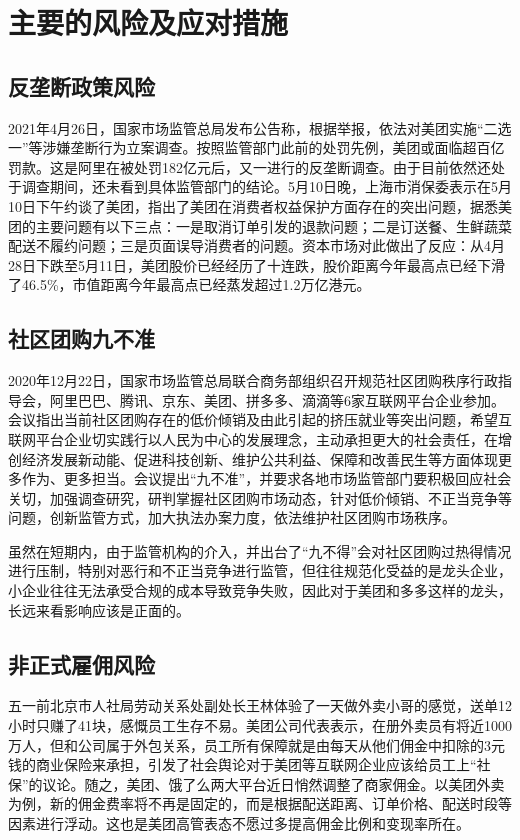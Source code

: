 \documentclass[UTF8,a4paper,12pt,lang=cn,fontset = windows]{elegantpaper} %
\begin{document}
\section{主要的风险及应对措施}
\subsection{反垄断政策风险}
2021年4月26日，国家市场监管总局发布公告称，根据举报，依法对美团实施“二选一”等涉嫌垄断行为立案调查。按照监管部门此前的处罚先例，美团或面临超百亿罚款。这是阿里在被处罚182亿元后，又一进行的反垄断调查。由于目前依然还处于调查期间，还未看到具体监管部门的结论。5月10日晚，上海市消保委表示在5月10日下午约谈了美团，指出了美团在消费者权益保护方面存在的突出问题，据悉美团的主要问题有以下三点：一是取消订单引发的退款问题；二是订送餐、生鲜蔬菜配送不履约问题；三是页面误导消费者的问题。资本市场对此做出了反应：从4月28日下跌至5月11日，美团股价已经经历了十连跌，股价距离今年最高点已经下滑了46.5\%，市值距离今年最高点已经蒸发超过1.2万亿港元。
\subsection{社区团购九不准}
2020年12月22日，国家市场监管总局联合商务部组织召开规范社区团购秩序行政指导会，阿里巴巴、腾讯、京东、美团、拼多多、滴滴等6家互联网平台企业参加。会议指出当前社区团购存在的低价倾销及由此引起的挤压就业等突出问题，希望互联网平台企业切实践行以人民为中心的发展理念，主动承担更大的社会责任，在增创经济发展新动能、促进科技创新、维护公共利益、保障和改善民生等方面体现更多作为、更多担当。会议提出“九不准”，并要求各地市场监管部门要积极回应社会关切，加强调查研究，研判掌握社区团购市场动态，针对低价倾销、不正当竞争等问题，创新监管方式，加大执法办案力度，依法维护社区团购市场秩序。

虽然在短期内，由于监管机构的介入，并出台了“九不得”会对社区团购过热得情况进行压制，特别对恶行和不正当竞争进行监管，但往往规范化受益的是龙头企业，小企业往往无法承受合规的成本导致竞争失败，因此对于美团和多多这样的龙头，长远来看影响应该是正面的。
\subsection{非正式雇佣风险}
五一前北京市人社局劳动关系处副处长王林体验了一天做外卖小哥的感觉，送单12小时只赚了41块，感慨员工生存不易。美团公司代表表示，在册外卖员有将近1000万人，但和公司属于外包关系，员工所有保障就是由每天从他们佣金中扣除的3元钱的商业保险来承担，引发了社会舆论对于美团等互联网企业应该给员工上“社保”的议论。随之，美团、饿了么两大平台近日悄然调整了商家佣金。以美团外卖为例，新的佣金费率将不再是固定的，而是根据配送距离、订单价格、配送时段等因素进行浮动。这也是美团高管表态不愿过多提高佣金比例和变现率所在。
\end{document}
